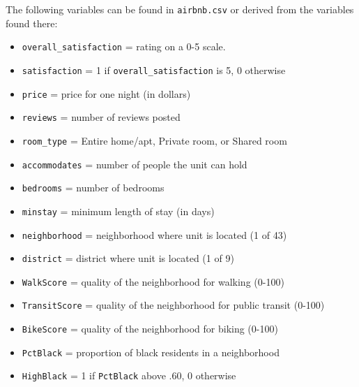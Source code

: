 \documentclass[
]{krantz}
\providecommand{\tightlist}{%
  \setlength{\itemsep}{0pt}\setlength{\parskip}{0pt}}
\begin{document}
The following variables can be found in \texttt{airbnb.csv} or derived from the variables found there:

\begin{itemize}
\tightlist
\item
  \texttt{overall\_satisfaction} = rating on a 0-5 scale.\\
\item
  \texttt{satisfaction} = 1 if \texttt{overall\_satisfaction} is 5, 0 otherwise
\item
  \texttt{price} = price for one night (in dollars)
\item
  \texttt{reviews} = number of reviews posted
\item
  \texttt{room\_type} = Entire home/apt, Private room, or Shared room
\item
  \texttt{accommodates} = number of people the unit can hold
\item
  \texttt{bedrooms} = number of bedrooms
\item
  \texttt{minstay} = minimum length of stay (in days)
\item
  \texttt{neighborhood} = neighborhood where unit is located (1 of 43)
\item
  \texttt{district} = district where unit is located (1 of 9)
\item
  \texttt{WalkScore} = quality of the neighborhood for walking (0-100)
\item
  \texttt{TransitScore} = quality of the neighborhood for public transit (0-100)
\item
  \texttt{BikeScore} = quality of the neighborhood for biking (0-100)
\item
  \texttt{PctBlack} = proportion of black residents in a neighborhood
\item
  \texttt{HighBlack} = 1 if \texttt{PctBlack} above .60, 0 otherwise
\end{itemize}
\end{document}
